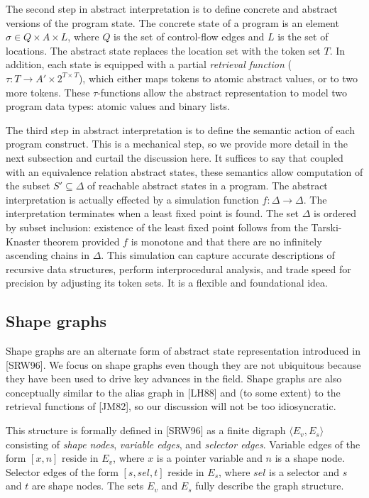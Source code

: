 \documentclass{article}
\begin{document}
The second step in abstract interpretation is to define concrete and
abstract versions of the program state.  The concrete state of a program is
an element $\sigma \in Q \times A \times L$, where $Q$ is the set of
control-flow edges and $L$ is the set of locations. The abstract state
replaces the location set with the token set $T$. In addition, each state is
equipped with a partial \textit{retrieval function} ($\tau : T \rightarrow
A' \times 2^{T \times T}$), which either maps tokens to atomic abstract
values, or to two more tokens. These $\tau$-functions allow the abstract
representation to model two program data types: atomic values and binary
lists.

The third step in abstract interpretation is to define the semantic action
of each program construct. This is a mechanical step, so we provide more
detail in the next subsection and curtail the discussion here. It suffices
to say that coupled with an equivalence relation abstract states, these
semantics allow computation of the subset $S' \subseteq \Delta$ of reachable
abstract states in a program. The abstract interpretation is actually
effected by a simulation function $f : \Delta \rightarrow \Delta$. The
interpretation terminates when a least fixed point is found. The set
$\Delta$ is ordered by subset inclusion: existence of the least fixed point
follows from the Tarski-Knaster theorem provided $f$ is monotone and that
there are no infinitely ascending chains in $\Delta$. This simulation can
capture accurate descriptions of recursive data structures, perform
interprocedural analysis, and trade speed for precision by adjusting its
token sets. It is a flexible and foundational idea.

\subsection{Shape graphs}

Shape graphs are an alternate form of abstract state representation
introduced in [SRW96]. We focus on shape graphs even though they are not
ubiquitous because they have been used to drive key advances in the field.
Shape graphs are also conceptually similar to the alias graph in [LH88] and
(to some extent) to the retrieval functions of [JM82], so our discussion
will not be too idiosyncratic. 

This structure is formally defined in [SRW96] as a
finite digraph $\langle E_v, E_s \rangle$ consisting of \textit{shape
nodes}, \textit{variable edges}, and \textit{selector edges}. Variable edges
of the form $[x, n]$ reside in $E_v$, where $x$ is a pointer variable and
$n$ is a shape node. Selector edges of the form $[s, sel, t]$ reside in
$E_s$, where $sel$ is a selector and $s$ and $t$ are shape nodes. The sets
$E_v$ and $E_s$ fully describe the graph structure. 
\end{document}
